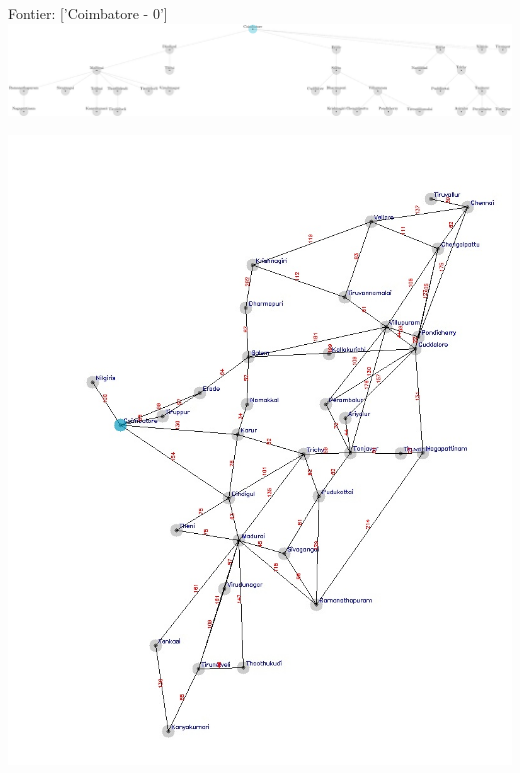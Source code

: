\documentclass[xcolor=table]{beamer}
\begin{document}
\begin{frame}
  { \tiny Fontier: ['Coimbatore - 0'] }
  \includegraphics[width=1\textwidth]{../UCSNodes/2-1.png}
  \begin{center}
    \includegraphics[height=0.6\textheight]{../UCSoutput/tamilUCS0.jpg}
  \end{center}
\end{frame}
\end{document}
